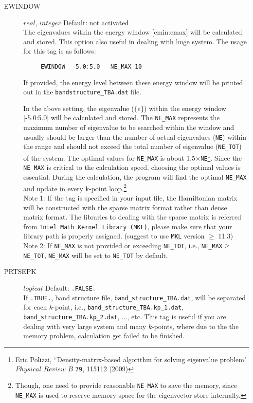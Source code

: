 \documentclass[a4paper,12pt]{scrartcl}
\makeatletter
\def\namedlabel#1#2{\begingroup
    #2%
    \def\@currentlabel{#2}%
    \phantomsection\label{#1}\endgroup
}
\makeatother
\begin{document}
\begin{description}
    \item[\namedlabel{tag:EWINDOW}{EWINDOW}] $real$, $integer$ Default: not activated \\
    The eigenvalues within the energy window [emin:emax] will be calculated and stored. This option also useful in dealing with huge system. The usage for this tag is as follows:
    
    \begin{verbatim}
     EWINDOW  -5.0:5.0   NE_MAX 10  
    \end{verbatim}

		If provided, the energy level between these energy window will be printed
		out in the \texttt{bandstructure\_TBA.dat} file. 

		In the above setting, the eigenvalue ($\{e\}$) within the energy window [-5.0:5.0] will be calculated and stored. The \texttt{NE\_MAX} represents the maximum number of eigenvalue to be searched within the window and usually should be larger than the number of actual eigenvalues (\texttt{NE}) within the range and should not exceed the total number of eigenvalue (\texttt{NE\_TOT}) of the system. The optimal values for \texttt{NE\_MAX} is about 1.5$\times$\texttt{NE}\footnote{Eric Polizzi, ``Density-matrix-based algorithm for solving eigenvalue problem" $Physical$ $Review$ $B$  \texttt{79}, 115112 (2009)}. Since the \texttt{NE\_MAX} is critical to the calculation speed, choosing the optimal values is essential. During the calculation, the program will find the optimal \texttt{NE\_MAX} and update in every k-point loop.\footnote{Though, one need to provide reasonable \texttt{NE\_MAX} to save the memory, since \texttt{NE\_MAX} is used to reserve memory space for the eigenvector store internally.}\\
		
      Note 1: If the tag is specified in your input file, the Hamiltonian matrix will be constructed with the sparse matrix format rather than dense matrix format. The libraries to dealing with the sparse matrix is referred from \texttt{Intel Math Kernel Library (MKL)}, please make sure that your library path is properly assigned. (suggest to use \texttt{MKL} version $\geq$ 11.3) \\
      
      Note 2: If \texttt{NE\_MAX} is not provided or exceeding \texttt{NE\_TOT}, i.e., \texttt{NE\_MAX}$\geq$\texttt{NE\_TOT}, \texttt{NE\_MAX} will be set to \texttt{NE\_TOT} by default. 
      
    \item[\namedlabel{tag:PRTSEPK}{PRTSEPK}] $logical$ Default: \texttt{.FALSE.} \\
		If \texttt{.TRUE.}, band structure file, \texttt{band\_structure\_TBA.dat}, will 
		be separated for each $k$-point, i.e., \texttt{band\_structure\_TBA.kp\_1.dat}, \texttt{band\_structure\_TBA.kp\_2.dat}, ..., etc. This tag is useful if you are dealing with very large system and many $k$-points, where due to the the memory problem, calculation get failed to be finished.


\end{description}
\end{document}
